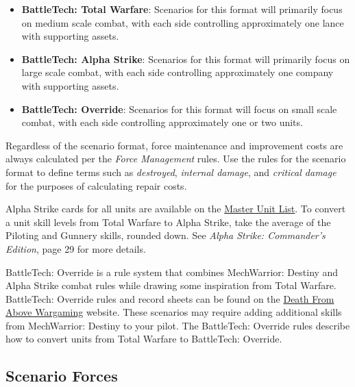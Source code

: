 \documentclass{article}
\begin{document}
\begin{itemize}

\item {\bfseries BattleTech: Total Warfare}: Scenarios for this format will primarily focus on medium scale combat, with each side controlling approximately one lance with supporting assets.

\item {\bfseries BattleTech: Alpha Strike}: Scenarios for this format will primarily focus on large scale combat, with each side controlling approximately one company with supporting assets.

\item {\bfseries BattleTech: Override}: Scenarios for this format will focus on small scale combat, with each side controlling approximately one or two units.

\end{itemize}

Regardless of the scenario format, force maintenance and improvement costs are always calculated per the \emph{Force Management} rules.
Use the rules for the scenario format to define terms such as \emph{destroyed}, \emph{internal damage}, and \emph{critical damage} for the purposes of calculating repair costs.

Alpha Strike cards for all units are available on the \href{http://www.masterunitlist.info}{Master Unit List}.
To convert a unit skill levels from Total Warfare to Alpha Strike, take the average of the Piloting and Gunnery skills, rounded down.
See \emph{Alpha Strike: Commander's Edition}, page 29 for more details.

BattleTech: Override is a rule system that combines MechWarrior: Destiny and Alpha Strike combat rules while drawing some inspiration from Total Warfare.
BattleTech: Override rules and record sheets can be found on the \href{https://dfawargaming.com}{Death From Above Wargaming} website.
These scenarios may require adding additional skills from MechWarrior: Destiny to your pilot.
The BattleTech: Override rules describe how to convert units from Total Warfare to BattleTech: Override.

\subsection{Scenario Forces}
\end{document}
